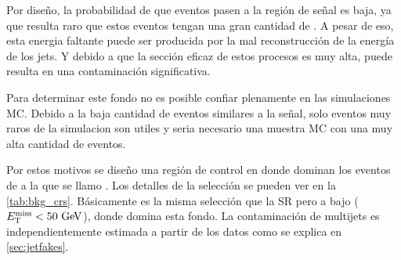 Por diseño, la probabilidad de que eventos {\gjet} pasen a la región de señal es
baja, ya que resulta raro que estos eventos tengan una gran cantidad de {\met}.
A pesar de eso, esta energia faltante puede ser producida por la mal
reconstrucción de la energía de los jets. Y debido a que la sección eficaz de
estos procesos es muy alta, puede resulta en una contaminación significativa.

Para determinar este fondo no es posible confiar plenamente en las simulaciones MC.
Debido a la baja cantidad de eventos similares a la señal, solo eventos
muy raros de la simulacion son utiles y seria necesario una muestra MC con
una muy alta cantidad de eventos.

Por estos motivos se diseño una región de control en donde dominan los eventos de
{\gjet} a la que se llamo {\CRQ}. Los detalles de la selección se pueden ver en
la \cref{tab:bkg_crs}. Básicamente es la misma selección que la SR pero a bajo
{\met} ($\met < 50 \gev$), donde domina esta fondo. La contaminación de multijets
es independientemente estimada a partir de los datos como se explica en
\cref{sec:jetfakes}.




